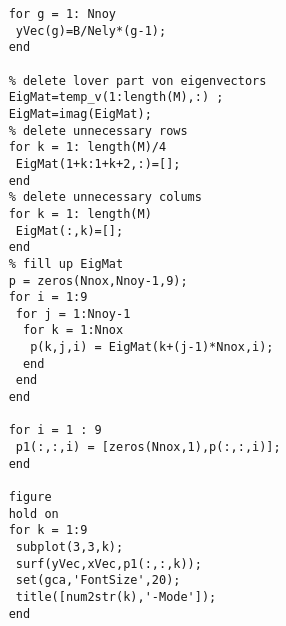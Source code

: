 \begin{lstlisting}
	for g = 1: Nnoy
	 yVec(g)=B/Nely*(g-1);    
	end
	
	% delete lover part von eigenvectors 
	EigMat=temp_v(1:length(M),:) ;   
	EigMat=imag(EigMat);
	% delete unnecessary rows 
	for k = 1: length(M)/4      
	 EigMat(1+k:1+k+2,:)=[];       
	end
	% delete unnecessary colums
	for k = 1: length(M)
	 EigMat(:,k)=[];         
	end
	% fill up EigMat
	p = zeros(Nnox,Nnoy-1,9);
	for i = 1:9
	 for j = 1:Nnoy-1
	  for k = 1:Nnox
	   p(k,j,i) = EigMat(k+(j-1)*Nnox,i);
	  end
	 end
	end
	
	for i = 1 : 9
	 p1(:,:,i) = [zeros(Nnox,1),p(:,:,i)];
	end
	
	figure
	hold on
	for k = 1:9
	 subplot(3,3,k);
	 surf(yVec,xVec,p1(:,:,k));
	 set(gca,'FontSize',20);
	 title([num2str(k),'-Mode']);
	end
	\end{lstlisting}
	

